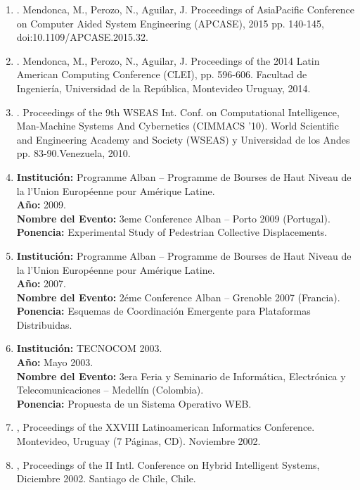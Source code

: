 \begin{enumerate}
\item {}. Mendonca, M., Perozo, N., Aguilar, J. Proceedings of AsiaPacific Conference on Computer Aided System Engineering (APCASE), 2015 pp. 140-145, doi:10.1109/APCASE.2015.32.

\item {}. Mendonca, M., Perozo, N., Aguilar, J. Proceedings of the 2014 Latin American Computing Conference (CLEI), pp. 596-606. Facultad de Ingeniería, Universidad de la República, Montevideo Uruguay, 2014.

\item {}. Proceedings of the 9th WSEAS Int. Conf. on Computational Intelligence, Man-Machine Systems And Cybernetics (CIMMACS '10). World Scientific and Engineering Academy and Society (WSEAS) y Universidad de los Andes pp. 83-90.Venezuela, 2010.

\item \textbf{Institución:} Programme Alban – Programme de Bourses de Haut Niveau de la
l’Union Européenne pour Amérique Latine.\\
\textbf{Año:} 2009.\\
\textbf{Nombre del Evento:} 3eme Conference Alban – Porto 2009 (Portugal).\\
\textbf{Ponencia:} Experimental Study of Pedestrian Collective Displacements.

\item \textbf{Institución:} Programme Alban – Programme de Bourses de Haut Niveau de la
l’Union Européenne pour Amérique Latine.\\
\textbf{Año:} 2007.\\
\textbf{Nombre del Evento:} 2éme Conference Alban – Grenoble 2007 (Francia).\\
\textbf{Ponencia:} Esquemas de Coordinación Emergente para Plataformas
Distribuidas.

\item \textbf{Institución:} TECNOCOM 2003.\\
\textbf{Año:} Mayo 2003.\\
\textbf{Nombre del Evento:} 3era Feria y Seminario de Informática, Electrónica y Telecomunicaciones – Medellín (Colombia).\\
\textbf{Ponencia:} Propuesta de un Sistema Operativo WEB.

\item {}, Proceedings of the XXVIII Latinoamerican Informatics Conference. Montevideo, Uruguay (7 Páginas, CD). Noviembre 2002.

\item {}, Proceedings of the II Intl. Conference on Hybrid Intelligent Systems, Diciembre 2002. Santiago de Chile, Chile.
\end{enumerate}

